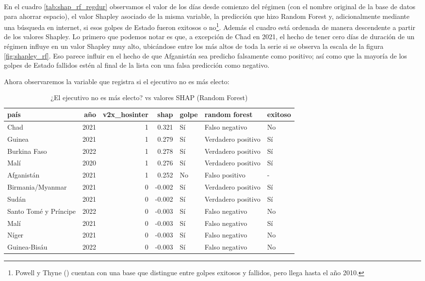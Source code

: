 \documentclass{article}
\begin{document}
En el cuadro \ref{tab:shap_rf_regdur} observamos el valor de los días desde comienzo del régimen
(con el nombre original de la base de datos para ahorrar espacio), el valor Shapley asociado de la 
misma variable, la predicción que hizo Random Forest y, adicionalmente mediante una búsqueda en 
internet, si esos golpes de Estado fueron exitosos o no\footnote{Powell y Thyne (\citeyear{Pow11}) 
cuentan con una base que distingue entre golpes exitosos y fallidos, pero llega hasta el año 2010.}. 
Además el cuadro está ordenada de manera descendente a partir de los valores Shapley. Lo primero que 
podemos notar es que, a excepción de Chad en 2021, el hecho de tener cero días de duración de un 
régimen influye en un valor Shapley muy alto, ubicándose entre los más altos de toda la serie si se 
observa la escala de la figura \ref{fig:shapley_rf}. Eso parece influir en el hecho de que Afganistán 
sea predicho falsamente como positivo; así como que la mayoría de los golpes de Estado fallidos estén 
al final de la lista con una falsa predicción como negativo.

Ahora observaremos la variable que registra si el ejecutivo no es más electo:

\begin{table}[H]
  \centering
  \begin{tabular}{lrrrlll}
    \toprule
    país & año & v2x\_hosinter & shap & golpe & random forest & exitoso \\
    \midrule
    Chad & 2021 & 1 & 0.321 & Sí & Falso negativo & No \\
    Guinea & 2021 & 1 & 0.279 & Sí & Verdadero positivo & Sí \\
    Burkina Faso & 2022 & 1 & 0.278 & Sí & Verdadero positivo & Sí \\
    Malí & 2020 & 1 & 0.276 & Sí & Verdadero positivo & Sí \\
    Afganistán & 2021 & 1 & 0.252 & No & Falso positivo & - \\
    Birmania/Myanmar & 2021 & 0 & -0.002 & Sí & Verdadero positivo & Sí \\
    Sudán & 2021 & 0 & -0.002 & Sí & Verdadero positivo & Sí \\
    Santo Tomé y Príncipe & 2022 & 0 & -0.003 & Sí & Falso negativo & No \\
    Malí & 2021 & 0 & -0.003 & Sí & Falso negativo & Sí \\
    Níger & 2021 & 0 & -0.003 & Sí & Falso negativo & No \\
    Guinea-Bisáu & 2022 & 0 & -0.003 & Sí & Falso negativo & No \\
    \bottomrule
    \end{tabular}
\caption{¿El ejecutivo no es más electo? vs valores SHAP (Random Forest) \label{tab:shap_rf_hosinter}}
\end{table}
\end{document}
